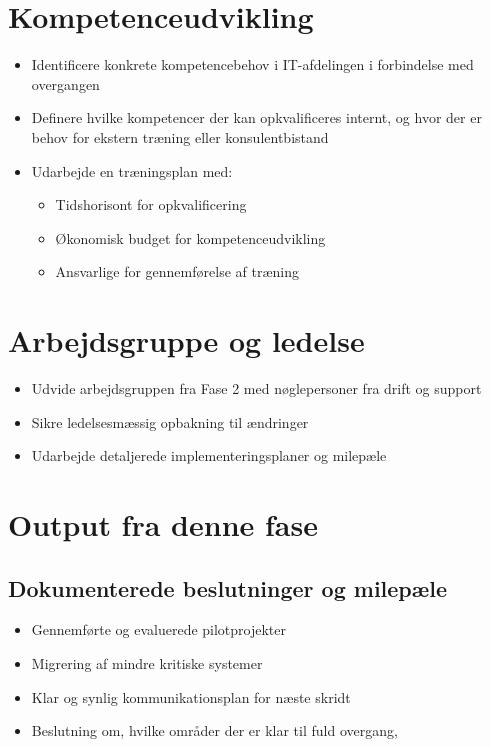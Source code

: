 \documentclass[a4paper,11pt,oneside]{book}
\def\tightlist{}
\begin{document}
\section{Kompetenceudvikling}\label{kompetenceudvikling}

\begin{itemize}
\item
  Identificere konkrete kompetencebehov i IT-afdelingen i forbindelse
  med overgangen
\item
  Definere hvilke kompetencer der kan opkvalificeres internt, og hvor
  der er behov for ekstern træning eller konsulentbistand
\item
  Udarbejde en træningsplan med:

  \begin{itemize}
  \tightlist
  \item
    Tidshorisont for opkvalificering
  \item
    Økonomisk budget for kompetenceudvikling
  \item
    Ansvarlige for gennemførelse af træning
  \end{itemize}
\end{itemize}

\section{Arbejdsgruppe og ledelse}\label{arbejdsgruppe-og-ledelse}

\begin{itemize}
\tightlist
\item
  Udvide arbejdsgruppen fra Fase 2 med nøglepersoner fra drift og
  support
\item
  Sikre ledelsesmæssig opbakning til ændringer
\item
  Udarbejde detaljerede implementeringsplaner og milepæle
\end{itemize}

\section{Output fra denne fase}\label{output-fra-denne-fase}

\subsection{Dokumenterede beslutninger og
milepæle}\label{dokumenterede-beslutninger-og-milepuxe6le}

\begin{itemize}
\tightlist
\item
  Gennemførte og evaluerede pilotprojekter
\item
  Migrering af mindre kritiske systemer
\item
  Klar og synlig kommunikationsplan for næste skridt
\item
  Beslutning om, hvilke områder der er klar til fuld overgang,
\end{itemize}
\end{document}
